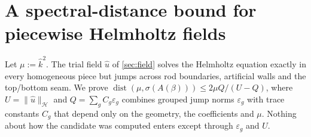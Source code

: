 \section{A spectral-distance bound for piecewise Helmholtz fields}\label{sec:bound}

Let $\mu:=\widehat k^2$. The trial field $\widehat u$ of \cref{sec:field}
solves the Helmholtz equation exactly in every homogeneous piece but jumps
across rod boundaries, artificial walls and the top/bottom seam. We prove $\operatorname{dist}(\mu,\sigma(A(\beta)))\le2\mu Q/(U-Q)$,
where $U=\|\widehat u\|_{\mathcal H}$ and $Q=\sum_gC_g\varepsilon_g$ combines
grouped jump norms $\varepsilon_g$ with trace constants $C_g$ that depend only on
the geometry, the coefficients and $\mu$. Nothing about how the candidate was
computed enters except through $\varepsilon_g$ and $U$.

